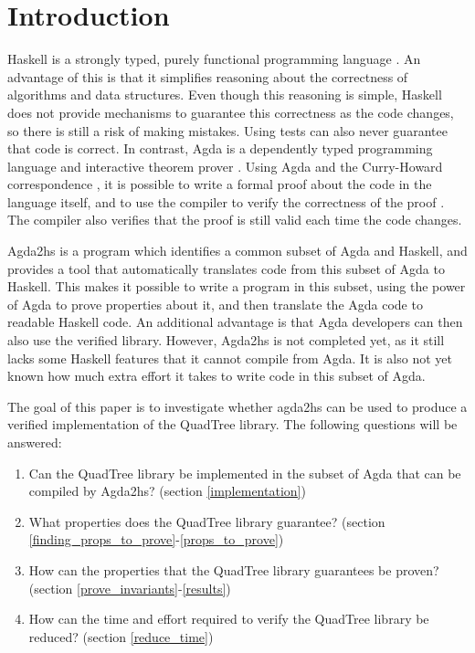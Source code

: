\section{Introduction}
Haskell is a strongly typed, purely functional programming language \cite{haskell}. An advantage of this is that it simplifies reasoning about the correctness of algorithms and data structures. Even though this reasoning is simple, Haskell does not provide mechanisms to guarantee this correctness as the code changes, so there is still a risk of making mistakes. Using tests can also never guarantee that code is correct. In contrast, Agda is a dependently typed programming language and interactive theorem prover \cite{agda}. Using Agda and the Curry-Howard correspondence \cite{chc}, it is possible to write a formal proof about the code in the language itself, and to use the compiler to verify the correctness of the proof \cite{schwaab, van}. The compiler also verifies that the proof is still valid each time the code changes. 

Agda2hs \cite{agda2hs} is a program which identifies a common subset of Agda and Haskell, and provides a tool that automatically translates code from this subset of Agda to Haskell. This makes it possible to write a program in this subset, using the power of Agda to prove properties about it, and then translate the Agda code to readable Haskell code. An additional advantage is that Agda developers can then also use the verified library. However, Agda2hs is not completed yet, as it still lacks some Haskell features that it cannot compile from Agda. It is also not yet known how much extra effort it takes to write code in this subset of Agda.

The goal of this paper is to investigate whether agda2hs can be used to produce a verified implementation of the QuadTree library\cite{quadtree}. The following questions will be answered:
\begin{enumerate}[label=(\roman*)]
	\itemsep-0.2em 
	\item Can the QuadTree library be implemented in the subset of Agda that can be compiled by Agda2hs? (section \ref{implementation})
	\item What properties does the QuadTree library guarantee? (section \ref{finding_props_to_prove}-\ref{props_to_prove})
	\item How can the properties that the QuadTree library guarantees be proven? (section \ref{prove_invariants}-\ref{results})
	\item How can the time and effort required to verify the QuadTree library be reduced? (section \ref{reduce_time})
\end{enumerate}
